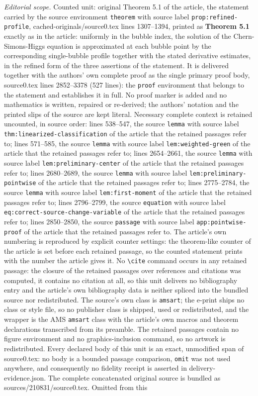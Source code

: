 \documentclass[10pt,a4paper]{amsart}
\numberwithin{equation}{section}
\theoremstyle{definition}
\theoremstyle{remark}
\begin{document}
\noindent\textit{Editorial scope.} Counted unit: original Theorem 5.1 of the article, the statement carried by the source environment \texttt{theorem} with source label \texttt{prop:refined-profile}, cached-originals/source0.tex lines 1307--1394, printed as \textbf{Theorem 5.1} exactly as in the article: uniformly in the bubble index, the solution of the Chern-Simons-Higgs equation is approximated at each bubble point by the corresponding single-bubble profile together with the stated derivative estimates, in the refined form of the three assertions of the statement. It is delivered together with the authors' own complete proof as the single primary proof body, source0.tex lines 2852--3378 (527 lines): the \texttt{proof} environment that belongs to the statement and establishes it in full. No proof marker is added and no mathematics is written, repaired or re-derived; the authors' notation and the printed slips of the source are kept literal. Necessary complete context is retained uncounted, in source order: lines 538--547, the source \texttt{lemma} with source label \texttt{thm:linearized-classification} of the article that the retained passages refer to; lines 571--585, the source \texttt{lemma} with source label \texttt{lem:weighted-green} of the article that the retained passages refer to; lines 2654--2661, the source \texttt{lemma} with source label \texttt{lem:preliminary-center} of the article that the retained passages refer to; lines 2680--2689, the source \texttt{lemma} with source label \texttt{lem:preliminary-pointwise} of the article that the retained passages refer to; lines 2775--2784, the source \texttt{lemma} with source label \texttt{lem:first-moment} of the article that the retained passages refer to; lines 2796--2799, the source \texttt{equation} with source label \texttt{eq:correct-source-change-variable} of the article that the retained passages refer to; lines 2850--2850, the source \texttt{passage} with source label \texttt{app:pointwise-proof} of the article that the retained passages refer to. The article's own numbering is reproduced by explicit counter settings: the theorem-like counter of the article is set before each retained passage, so the counted statement prints with the number the article gives it. No \texttt{\textbackslash cite} command occurs in any retained passage: the closure of the retained passages over references and citations was computed, it contains no citation at all, so this unit delivers no bibliography entry and the article's own bibliography data is neither spliced into the bundled source nor redistributed. The source's own class is \texttt{amsart}; the e-print ships no class or style file, so no publisher class is shipped, used or redistributed, and the wrapper is the AMS \texttt{amsart} class with the article's own macros and theorem declarations transcribed from its preamble. The retained passages contain no figure environment and no graphics-inclusion command, so no artwork is redistributed. Every declared body of this unit is an exact, unmodified span of source0.tex: no body is a bounded passage comparison, \texttt{omit} was not used anywhere, and consequently no fidelity receipt is asserted in delivery-evidence.json. The complete concatenated original source is bundled as sources/210831/source0.tex. Omitted from this 
\end{document}
